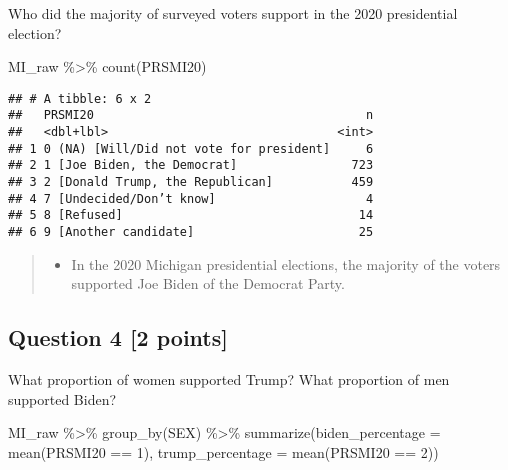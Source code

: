 \documentclass[
]{article}
\newenvironment{Shaded}{\begin{snugshade}}{\end{snugshade}}
\newcommand{\AttributeTok}[1]{\textcolor[rgb]{0.77,0.63,0.00}{#1}}
\newcommand{\DecValTok}[1]{\textcolor[rgb]{0.00,0.00,0.81}{#1}}
\newcommand{\FunctionTok}[1]{\textcolor[rgb]{0.00,0.00,0.00}{#1}}
\newcommand{\NormalTok}[1]{#1}
\newcommand{\SpecialCharTok}[1]{\textcolor[rgb]{0.00,0.00,0.00}{#1}}
\providecommand{\tightlist}{%
  \setlength{\itemsep}{0pt}\setlength{\parskip}{0pt}}
\begin{document}
Who did the majority of surveyed voters support in the 2020 presidential
election?

\begin{Shaded}
\begin{Highlighting}[]
\NormalTok{MI\_raw }\SpecialCharTok{\%\textgreater{}\%}
  \FunctionTok{count}\NormalTok{(PRSMI20)}
\end{Highlighting}
\end{Shaded}

\begin{verbatim}
## # A tibble: 6 x 2
##   PRSMI20                                      n
##   <dbl+lbl>                                <int>
## 1 0 (NA) [Will/Did not vote for president]     6
## 2 1 [Joe Biden, the Democrat]                723
## 3 2 [Donald Trump, the Republican]           459
## 4 7 [Undecided/Don’t know]                     4
## 5 8 [Refused]                                 14
## 6 9 [Another candidate]                       25
\end{verbatim}

\begin{quote}
\begin{itemize}
\tightlist
\item
  In the 2020 Michigan presidential elections, the majority of the
  voters supported Joe Biden of the Democrat Party.
\end{itemize}
\end{quote}

\hypertarget{question-4-2-points}{%
\subsection{Question 4 {[}2 points{]}}\label{question-4-2-points}}

What proportion of women supported Trump? What proportion of men
supported Biden?

\begin{Shaded}
\begin{Highlighting}[]
\NormalTok{MI\_raw }\SpecialCharTok{\%\textgreater{}\%}
  \FunctionTok{group\_by}\NormalTok{(SEX) }\SpecialCharTok{\%\textgreater{}\%}
  \FunctionTok{summarize}\NormalTok{(}\AttributeTok{biden\_percentage =} \FunctionTok{mean}\NormalTok{(PRSMI20 }\SpecialCharTok{==} \DecValTok{1}\NormalTok{), }\AttributeTok{trump\_percentage =} \FunctionTok{mean}\NormalTok{(PRSMI20 }\SpecialCharTok{==} \DecValTok{2}\NormalTok{))}
\end{Highlighting}
\end{Shaded}
\end{document}
